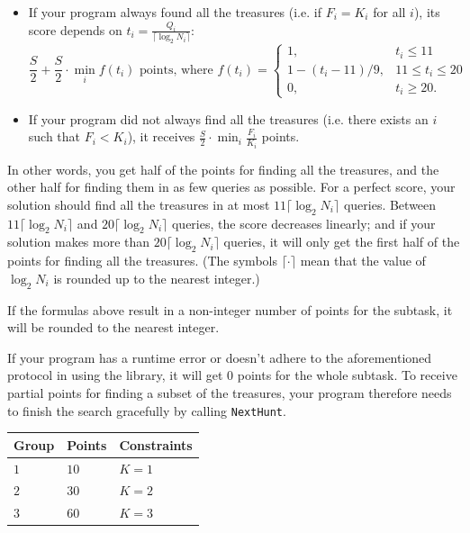\begin{itemize}
  \item If your program always found all the treasures (i.e. if $F_i = K_i$ for
        all $i$), its score depends on
        $t_i = \frac{Q_i}{\lceil \log_2 N_i \rceil}$:
        \[
          \frac{S}{2} + \frac{S}{2} \cdot \min_i f(t_i) \text{ points, where }
          f(t_i) = \begin{cases}
            1, & t_i \leq 11 \\
            1 - (t_i - 11)/9, & 11 \leq t_i \leq 20 \\
            0, & t_i \geq 20.
          \end{cases}
        \]
  \item If your program did not always find all the treasures (i.e. there exists
        an $i$ such that $F_i < K_i$), it receives
        $\frac{S}{2} \cdot \min_i \frac{F_i}{K_i}$ points.
\end{itemize}

In other words, you get half of the points for finding all the treasures, and the
other half for finding them in as few queries as possible. For a perfect score,
your solution should find all the treasures in at most
$11 \lceil \log_2 N_i \rceil$ queries. Between $11 \lceil \log_2 N_i \rceil$ and
$20 \lceil \log_2 N_i \rceil$ queries, the score decreases linearly; and if your
solution makes more than $20 \lceil \log_2 N_i \rceil$ queries, it will only get
the first half of the points for finding all the treasures. (The symbols
$\lceil \cdot \rceil$ mean that the value of $\log_2 N_i$ is rounded up to the
nearest integer.)

If the formulas above result in a non-integer number of points for the subtask, it
will be rounded to the nearest integer.

If your program has a runtime error or doesn't adhere to the aforementioned
protocol in using the library, it will get $0$ points for the whole subtask. To
receive partial points for finding a subset of the treasures, your program
therefore needs to finish the search gracefully by calling \texttt{NextHunt}.

\noindent
\begin{tabular}{| l | l | p{12cm} |}
  \hline
  \textbf{Group} & \textbf{Points} & \textbf{Constraints} \\ \hline
  $1$ & $10$ & $K = 1$ \\ \hline
  $2$ & $30$ & $K = 2$ \\ \hline
  $3$ & $60$ & $K = 3$ \\ \hline
\end{tabular}

